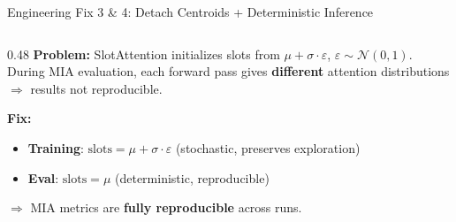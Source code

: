 \documentclass[aspectratio=169, 10pt]{beamer}
\newcommand{\fix}[1]{\textcolor{goodgreen}{\textbf{#1}}}
\begin{document}
\begin{frame}{Engineering Fix 3 \& 4: Detach Centroids + Deterministic Inference}
\begin{columns}[T]
\begin{column}{0.48\textwidth}
\vspace{0.1cm}
\small
\textbf{Problem:} SlotAttention initializes slots from $\mu + \sigma \cdot \varepsilon$, $\varepsilon \sim \mathcal{N}(0,1)$. During MIA evaluation, each forward pass gives \textbf{different} attention distributions $\Rightarrow$ results not reproducible.

\vspace{0.15cm}
\textbf{Fix:}
\begin{itemize}\small\setlength{\itemsep}{2pt}
    \item \textbf{Training}: $\text{slots} = \mu + \sigma \cdot \varepsilon$ (stochastic, preserves exploration)
    \item \textbf{Eval}: $\text{slots} = \mu$ (deterministic, reproducible)
\end{itemize}

\vspace{0.1cm}
\begin{center}
\end{center}

$\Rightarrow$ MIA metrics are \fix{fully reproducible} across runs.
\end{column}
\end{columns}

\end{frame}
\end{document}
